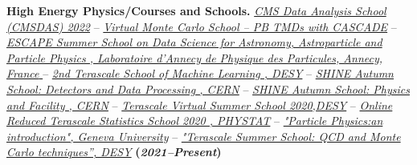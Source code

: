 \documentclass[11pt]{res}
\begin{document}
\begin{resume}
\textbf{High Energy Physics/Courses and Schools.}
\href{https://lpc.fnal.gov/programs/schools-workshops/cmsdas.shtml}{\textit{CMS Data Analysis School (CMSDAS) 2022}} -- \href{https://drive.google.com/file/d/1Ui4phtxuFPd-trfQp6jCmL4qZOgEJvlf/view}{\textit{Virtual Monte Carlo School -- PB TMDs with CASCADE}} -- \href{https://drive.google.com/file/d/1D9BjE1nlL8UmRmZ3HQNqC6Cq1OxK0zB-/view?usp=sharing}{\textit{ESCAPE Summer School on Data Science for Astronomy, Astroparticle and Particle Physics , Laboratoire d’Annecy de Physique des Particules, Annecy, France }} -- \href{https://drive.google.com/file/d/11AAS10GLKvA5oR2oZmcjLj1YBwBevQue/view?usp=sharing}{\textit{2nd Terascale School of Machine Learning , DESY}} -- \href{https://indico.cern.ch/event/964916/overview}{\textit{SHINE Autumn School: Detectors and Data Processing , CERN}} -- \href{https://indico.cern.ch/event/963826/}{\textit{SHINE Autumn School: Physics and Facility , CERN}} -- \href{https://indico.desy.de/event/26403/}{\textit{Terascale Virtual Summer School 2020,DESY}} -- \href{https://indico.desy.de/event/25594/}{\textit{Online Reduced Terascale Statistics School 2020 , PHYSTAT}} -- \href{https://www.coursera.org/account/accomplishments/certificate/CMVH65UHPLR3}{\textit{"Particle Physics:an introduction", Geneva University}} -- \href{https://drive.google.com/file/d/1fxuisoVa6oLr7eA6mWlE-xZxAs_ifsk6/view}{\textit{"Terascale Summer School: QCD and Monte Carlo techniques”, DESY}} \textbf{(\textit{2021--Present})}



\end{resume}
\end{document}
